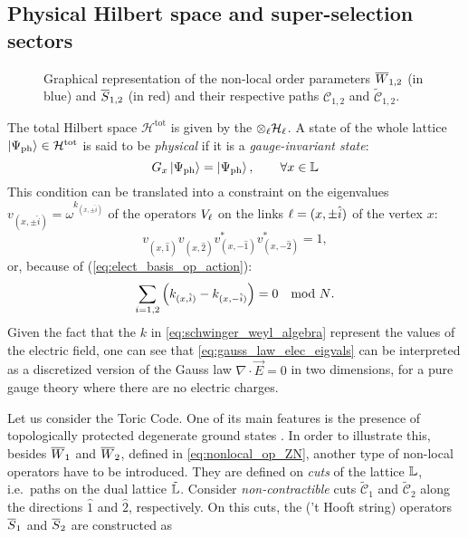 %
%
\subsection{Physical Hilbert space and super-selection sectors}
\label{sub:physical_hilbert_space_and_super_selection_sectors}




\begin{figure}[t]
    \centering
    
    \caption{Graphical representation of the non-local order parameters $\overline{W}_{1,2}$ (in blue) and $\overline{S}_{1,2}$ (in red) and their respective paths $\mathcal{C}_{1,2}$ and $\tilde{\mathcal{C}}_{1,2}$.}
    \label{fig:nonlocal_operators}
\end{figure}

The total Hilbert space $\mathcal{H}^{\text{tot}}$ is given by the $\otimes_{\ell} \mathcal{H}_{\ell}$.
A state of the whole lattice $\ket{\Psi_{\text{ph}}} \in \mathcal{H}^{\text{tot}}$ is said to be \emph{physical} if it is a \emph{gauge-invariant state}:
\begin{equation}
    G_x \ket{\Psi_{\text{ph}}} = \ket{\Psi_{\text{ph}}}, \qquad \forall x \in \mathbb{L}
    \label{eq:gauss_law}
\end{equation}
This condition can be translated into a constraint on the eigenvalues $v_{(x, \pm \hat{i})}= \omega^{k_{(x, \pm \hat{i})} }$  of the operators $V_\ell$ on the links $\ell = (x, \pm \hat{i})$ of the vertex $x$:
\begin{equation}
    v_{(x, \hat{1})}^{\phantom{\ast}}
    v_{(x, \hat{2})}^{\phantom{\ast}}
    v_{(x, -\hat{1})}^\ast
    v_{(x, -\hat{2})}^\ast = 1,
\end{equation}
or, because of (\ref{eq:elect_basis_op_action}):
\begin{equation}
    \sum_{i=1,2} \pqty{ k_{(x, \hat{i})} - k_{(x, -\hat{i})} } = 0 \quad \text{mod $N$}.
    \label{eq:gauss_law_elec_eigvals}
\end{equation}
Given the fact that the $k$ in \eqref{eq:schwinger_weyl_algebra} represent the values of the electric field, one can see that \eqref{eq:gauss_law_elec_eigvals} can be interpreted as a discretized version of the Gauss law $\nabla \cdot \vec{E} = 0$ in two dimensions,
for a pure gauge theory where there are no electric charges.

Let us consider the Toric Code.
One of its main features is the presence of topologically protected degenerate ground states \cite{kitaev2003fault}.
In order to illustrate this, besides $\overline{W}_1$ and $\overline{W}_2$, defined in \eqref{eq:nonlocal_op_ZN}, another type of non-local operators have to be introduced.
They are defined on \emph{cuts} of the lattice $\mathbb{L}$, i.e.~paths on the dual lattice $\tilde{\mathbb{L}}$.
Consider \emph{non-contractible} cuts $\tilde{\mathcal{C}}_1$ and $\tilde{\mathcal{C}}_2$ along the directions $\hat{1}$ and $\hat{2}$, respectively.
On this cuts, the ('t Hooft string) operators $\overline{S}_1$ and $\overline{S}_2$ are constructed as

